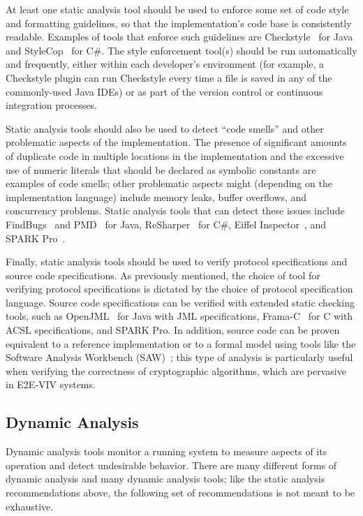 At least one static analysis tool should be used to enforce some set
of code style and formatting guidelines, so that the implementation's
code base is consistently readable. Examples of tools that enforce
such guidelines are Checkstyle~\cite{Checkstyle} for Java and
StyleCop~\cite{StyleCop} for C\#. The style enforcement tool(s) should
be run automatically and frequently, either within each developer's
environment (for example, a Checkstyle plugin can run Checkstyle every
time a file is saved in any of the commonly-used Java IDEs) or as part
of the version control or continuous integration processes.

Static analysis tools should also be used to detect ``code smells''
and other problematic aspects of the implementation. The presence of
significant amounts of duplicate code in multiple locations in the
implementation and the excessive use of numeric literals that should
be declared as symbolic constants are examples of code smells; other
problematic aspects might (depending on the implementation language)
include memory leaks, buffer overflows, and concurrency problems.
Static analysis tools that can detect these issues include
FindBugs~\cite{FindBugs} and PMD~\cite{PMD} for Java,
ReSharper~\cite{ReSharper} for C\#, Eiffel
Inspector~\cite{EiffelInspector}, and SPARK Pro~\cite{SPARKPro}.

Finally, static analysis tools should be used to verify protocol
specifications and source code specifications. As previously
mentioned, the choice of tool for verifying protocol specifications is
dictated by the choice of protocol specification language. Source code
specifications can be verified with extended static checking tools,
such as OpenJML~\cite{OpenJML} for Java with JML specifications,
Frama-C~\cite{Frama-C} for C with ACSL specifications, and SPARK
Pro. In addition, source code can be proven equivalent to a reference
implementation or to a formal model using tools like the Software
Analysis Workbench (SAW)~\cite{SAW}; this type of analysis is
particularly useful when verifying the correctness of cryptographic
algorithms, which are pervasive in E2E-VIV systems.

\subsection{Dynamic Analysis}

Dynamic analysis tools monitor a running system to measure aspects of
its operation and detect undesirable behavior. There are many
different forms of dynamic analysis and many dynamic analysis tools;
like the static analysis recommendations above, the following set of
recommendations is not meant to be exhaustive.

